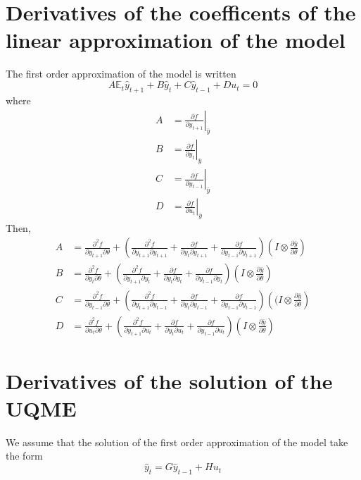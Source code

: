 \documentclass{article}
\begin{document}
\section{Derivatives of the coefficents of the linear
  approximation of the model}  
The first order approximation of the model is written
\[
A \mathbb{E}_t\hat y_{t+1} + B \hat y_t + C \hat y_{t-1} + Du_t = 0
\]
where
\begin{align*}
  A &= \left.\frac{\partial f}{\partial y_{t+1}} \right|_{\bar y}\\
  B &= \left.\frac{\partial f}{\partial y_t} \right|_{\bar y}\\
  C &= \left.\frac{\partial f}{\partial y_{t-1}} \right|_{\bar y}\\
  D &= \left.\frac{\partial f}{\partial u_t} \right|_{\bar y}
\end{align*}
Then,
\begin{align*}
  A &= \frac{\partial^2 f}{\partial y_{t+1}\partial \theta} + \left(\frac{\partial^2
  f}{\partial y_{t+1}\partial y_{t+1}} +\frac{\partial f}{\partial y_t\partial y_{t+1}} + \frac{\partial
      f}{\partial y_{t-1}\partial y_{t+1}}\right)\left(I\otimes \frac{\partial \bar
    y}{\partial \theta}\right)\\ 
  B &= \frac{\partial^2 f}{\partial y_t\partial \theta} + \left(\frac{\partial^2
  f}{\partial y_{t+1}\partial y_t} +\frac{\partial f}{\partial y_t\partial y_t} + \frac{\partial
      f}{\partial y_{t-1}\partial y_t}\right)\left(I\otimes \frac{\partial \bar
    y}{\partial \theta}\right)\\ 
  C &= \frac{\partial^2 f}{\partial y_{t-1}\partial \theta} + \left(\frac{\partial^2
  f}{\partial y_{t+1}\partial y_{t-1}} +\frac{\partial f}{\partial y_t\partial y_{t-1}} + \frac{\partial
      f}{\partial y_{t-1}\partial y_{t-1}}\right)\left((I\otimes \frac{\partial \bar
    y}{\partial \theta}\right)\\ 
  D &= \frac{\partial^2 f}{\partial u_t\partial \theta} + \left(\frac{\partial^2
  f}{\partial y_{t+1}\partial u_t} +\frac{\partial f}{\partial y_t\partial u_t} + \frac{\partial
      f}{\partial y_{t-1}\partial u_t}\right)\left(I\otimes \frac{\partial \bar
    y}{\partial \theta}\right)
\end{align*}

\section{Derivatives of the solution of the UQME}

We assume that the solution of the first order approximation of the
model take the form
\[
\hat y_t = G\hat y_{t-1} + Hu_t
\]
\end{document}
